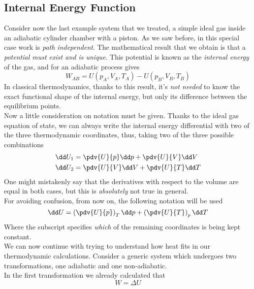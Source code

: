 \documentclass[../qm.tex]{subfiles}
\begin{document}
\subsection{Internal Energy Function}
Consider now the last example system that we treated, a simple ideal gas inside an adiabatic cylinder chamber with a piston. As we saw before, in this special case work is \textit{path independent}. The mathematical result that we obtain is that a \textit{potential must exist and is unique}. This potential is known as the \textit{internal energy} of the gas, and for an adiabatic process gives
\begin{equation}
	W_{AB}=U(p_A, V_A, T_A)-U(p_B, V_B, T_B)
	\label{eq:inten.1}
\end{equation}
In classical thermodynamics, thanks to this result, it's \textit{not needed} to know the exact functional shape of the internal energy, but only its difference between the equilibrium points.\\
Now a little consideration on notation must be given. Thanks to the ideal gas equation of state, we can always write the internal energy differential with two of the three thermodynamic coordinates, thus, taking two of the three possible combinations
\begin{equation*}
	\begin{aligned}
		\dd U_1&= \pdv{U}{p}\dd p+\pdv{U}{V}\dd V\\
		\dd U_2&= \pdv{U}{V}\dd V+\pdv{U}{T}\dd T
	\end{aligned}
\end{equation*}
One might mistakenly say that the derivatives with respect to the volume are equal in both cases, but this is \textit{absolutely} not true in general.\\
For avoiding confusion, from now on, the following notation will be used
\begin{equation}
	\dd U = \left( \pdv{U}{p} \right)_T\dd p + \left( \pdv{U}{T} \right)_p\dd T
	\label{eq:not.1}
\end{equation}
Where the subscript specifies \textit{which} of the remaining coordinates is being kept constant.\\
We can now continue with trying to understand how heat fits in our thermodynamic calculations. Consider a generic system which undergoes two transformations, one adiabatic and one non-adiabatic.\\
In the first transformation we already calculated that
\begin{equation*}
	W=\Delta U
\end{equation*}
\end{document}
